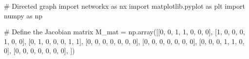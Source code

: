 \documentclass[
  letterpaper,
  DIV=11,
  numbers=noendperiod]{scrreprt}
\newenvironment{Shaded}{\begin{snugshade}}{\end{snugshade}}
\newcommand{\CommentTok}[1]{\textcolor[rgb]{0.37,0.37,0.37}{#1}}
\newcommand{\DecValTok}[1]{\textcolor[rgb]{0.68,0.00,0.00}{#1}}
\newcommand{\ImportTok}[1]{\textcolor[rgb]{0.00,0.46,0.62}{#1}}
\newcommand{\NormalTok}[1]{\textcolor[rgb]{0.00,0.23,0.31}{#1}}
\newcommand{\OperatorTok}[1]{\textcolor[rgb]{0.37,0.37,0.37}{#1}}
\begin{document}
\begin{tcolorbox}[enhanced jigsaw, titlerule=0mm, breakable, bottomrule=.15mm, toprule=.15mm, colbacktitle=quarto-callout-note-color!10!white, rightrule=.15mm, toptitle=1mm, opacityback=0, left=2mm, coltitle=black, title=\textcolor{quarto-callout-note-color}{\faInfo}\hspace{0.5em}{Python code}, colframe=quarto-callout-note-color-frame, opacitybacktitle=0.6, leftrule=.75mm, bottomtitle=1mm, arc=.35mm, colback=white]

\begin{Shaded}
\begin{Highlighting}[]
\CommentTok{\# Directed graph}
\ImportTok{import}\NormalTok{ networkx }\ImportTok{as}\NormalTok{ nx}
\ImportTok{import}\NormalTok{ matplotlib.pyplot }\ImportTok{as}\NormalTok{ plt}
\ImportTok{import}\NormalTok{ numpy }\ImportTok{as}\NormalTok{ np}


\CommentTok{\# Define the Jacobian matrix}
\NormalTok{M\_mat }\OperatorTok{=}\NormalTok{ np.array([[}\DecValTok{0}\NormalTok{, }\DecValTok{0}\NormalTok{, }\DecValTok{1}\NormalTok{, }\DecValTok{1}\NormalTok{, }\DecValTok{0}\NormalTok{, }\DecValTok{0}\NormalTok{, }\DecValTok{0}\NormalTok{],}
\NormalTok{                  [}\DecValTok{1}\NormalTok{, }\DecValTok{0}\NormalTok{, }\DecValTok{0}\NormalTok{, }\DecValTok{0}\NormalTok{, }\DecValTok{1}\NormalTok{, }\DecValTok{0}\NormalTok{, }\DecValTok{0}\NormalTok{],}
\NormalTok{                  [}\DecValTok{0}\NormalTok{, }\DecValTok{1}\NormalTok{, }\DecValTok{0}\NormalTok{, }\DecValTok{0}\NormalTok{, }\DecValTok{0}\NormalTok{, }\DecValTok{1}\NormalTok{, }\DecValTok{1}\NormalTok{],}
\NormalTok{                  [}\DecValTok{0}\NormalTok{, }\DecValTok{0}\NormalTok{, }\DecValTok{0}\NormalTok{, }\DecValTok{0}\NormalTok{, }\DecValTok{0}\NormalTok{, }\DecValTok{0}\NormalTok{, }\DecValTok{0}\NormalTok{],}
\NormalTok{                  [}\DecValTok{0}\NormalTok{, }\DecValTok{0}\NormalTok{, }\DecValTok{0}\NormalTok{, }\DecValTok{0}\NormalTok{, }\DecValTok{0}\NormalTok{, }\DecValTok{0}\NormalTok{, }\DecValTok{0}\NormalTok{],}
\NormalTok{                  [}\DecValTok{0}\NormalTok{, }\DecValTok{0}\NormalTok{, }\DecValTok{0}\NormalTok{, }\DecValTok{1}\NormalTok{, }\DecValTok{1}\NormalTok{, }\DecValTok{0}\NormalTok{, }\DecValTok{0}\NormalTok{],}
\NormalTok{                  [}\DecValTok{0}\NormalTok{, }\DecValTok{0}\NormalTok{, }\DecValTok{0}\NormalTok{, }\DecValTok{0}\NormalTok{, }\DecValTok{0}\NormalTok{, }\DecValTok{0}\NormalTok{, }\DecValTok{0}\NormalTok{],}
\NormalTok{                 ])}


\end{Highlighting}
\end{Shaded}
\end{tcolorbox}
\end{document}
